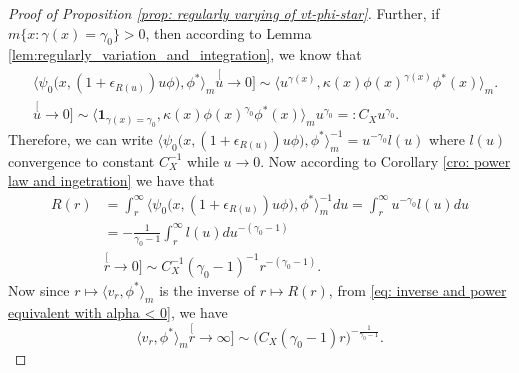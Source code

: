 \documentclass[12pt, a4paper]{amsart}
\theoremstyle{definition}
\numberwithin{equation}{section}
\begin{document}
\begin{proof}[Proof of Proposition \ref{prop: regularly varying of vt-phi-star}]
	Further, if $m\{x: \gamma(x) = \gamma_0\}> 0$, then according to Lemma \ref{lem:regularly_variation_and_integration}, we know that
\[\begin{split}
	&\big\langle \psi_0 \big(x,( 1 + \epsilon_{R(u)} ) u \phi \big), \phi^* \big\rangle_m
	\stackrel[u\to 0]{}{\sim}  \langle u^{\gamma(x)} , \kappa (x)\phi(x)^{\gamma(x)} \phi^*(x) \rangle_m.
	\\ & \stackrel[u\to 0]{}{\sim}  \langle \mathbf 1_{\gamma(x)= \gamma_0}, \kappa (x)\phi(x)^{\gamma_0} \phi^*(x) \rangle_m u^{\gamma_0}
	=: C_X u^{\gamma_0}.
\end{split}\]
	Therefore, we can write $\big\langle \psi_0 \big(x,( 1 + \epsilon_{R(u)} ) u \phi \big), \phi^* \big\rangle_m^{-1} = u^{-\gamma_0} l(u)$ where $l(u)$ convergence to constant $C_X^{-1}$ while $u \to 0$.
	Now according to Corollary \ref{cro: power law and ingetration} we have that
\[\begin{split}
	R(r)
	&= \int_r^\infty \big\langle \psi_0 \big(x,( 1 + \epsilon_{R(u)} ) u \phi \big), \phi^* \big\rangle_m^{-1} du
	= \int_r^\infty u^{-\gamma_0} l(u) du
	\\&= -\frac{1}{\gamma_0-1}\int_r^\infty l(u) du^{-(\gamma_0 - 1)}
	\\&\stackrel[r\to 0]{}{\sim} C_X^{-1} (\gamma_0-1)^{-1} r^{-(\gamma_0 - 1)}.
\end{split}\]
	Now since $r\mapsto \langle v_r,\phi^*\rangle_m$ is the inverse of $r\mapsto R(r)$, from \eqref{eq: inverse and power equivalent with alpha < 0}, we have
\[
	\langle v_r,\phi^*\rangle_m
	\stackrel[r\to \infty]{}{\sim} \big(C_X (\gamma_0-1) r \big)^{-\frac{1}{\gamma_0 - 1}}.
\]
\end{proof}
\end{document}
